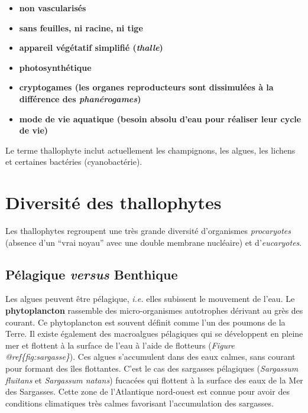 \documentclass[
]{book}
\providecommand{\tightlist}{%
  \setlength{\itemsep}{0pt}\setlength{\parskip}{0pt}}
\begin{document}
\begin{itemize}
\tightlist
\item
  \textbf{non vascularisés}
\item
  \textbf{sans feuilles, ni racine, ni tige}
\item
  \textbf{appareil végétatif simplifié (\emph{thalle})}
\item
  \textbf{photosynthétique}
\item
  \textbf{cryptogames (les organes reproducteurs sont dissimulées à la différence des \emph{phanérogames})}
\item
  \textbf{mode de vie aquatique (besoin absolu d'eau pour réaliser leur cycle de vie)}
\end{itemize}

Le terme thallophyte inclut actuellement les champignons, les algues, les lichens et certaines bactéries (cyanobactérie).

\hypertarget{diversituxe9-des-thallophytes}{%
\section{Diversité des thallophytes}\label{diversituxe9-des-thallophytes}}

Les thallophytes regroupent une très grande diversité d'organismes \emph{procaryotes} (absence d'un ``vrai noyau'' avec une double membrane nucléaire) et d'\emph{eucaryotes}.

\hypertarget{puxe9lagique-versus-benthique}{%
\subsection{\texorpdfstring{Pélagique \emph{versus} Benthique}{Pélagique versus Benthique}}\label{puxe9lagique-versus-benthique}}

Les algues peuvent être pélagique, \emph{i.e.} elles subissent le mouvement de l'eau. Le \textbf{phytoplancton} rassemble des micro-organismes autotrophes dérivant au grès des courant. Ce phytoplancton est souvent définit comme l'un des poumons de la Terre. Il existe également des macroalgues pélagiques qui se développent en pleine mer et flottent à la surface de l'eau à l'aide de flotteurs (\emph{Figure @ref\{fig:sargasse\}}). Ces algues s'accumulent dans des eaux calmes, sans courant pour formant des îles flottantes. C'est le cas des sargasses pélagiques (\emph{Sargassum fluitans} et \emph{Sargassum natans}) fucacées qui flottent à la surface des eaux de la Mer des Sargasses. Cette zone de l'Atlantique nord-ouest est connue pour avoir des conditions climatiques très calmes favorisant l'accumulation des sargasses.
\end{document}
